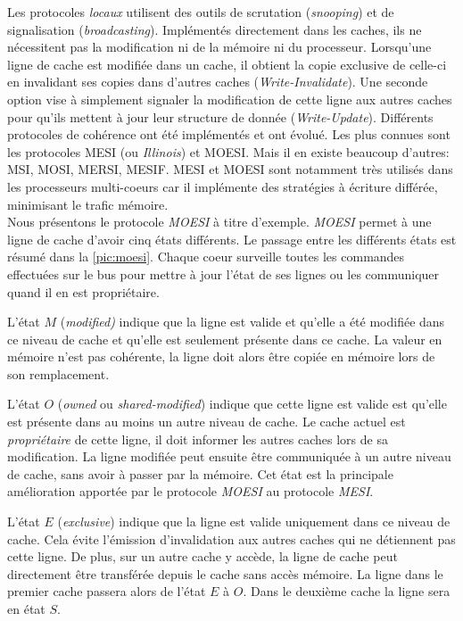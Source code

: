             Les protocoles \textit{locaux} utilisent des outils de scrutation (\textit{snooping}) et de signalisation (\textit{broadcasting}). Implémentés directement dans les caches, ils ne nécessitent pas la modification ni de la mémoire ni du processeur. Lorsqu'une ligne de cache est modifiée dans un cache, il obtient la copie exclusive de celle-ci en invalidant ses copies dans d'autres caches (\textit{Write-Invalidate}). Une seconde option vise à simplement signaler la modification de cette ligne aux autres caches pour qu'ils mettent à jour leur structure de donnée (\textit{Write-Update}).  Différents protocoles de cohérence ont été implémentés et ont évolué. Les plus connues sont les protocoles MESI (ou \textit{Illinois}) \cite{papamarcos1984low} et MOESI. Mais il en existe beaucoup d'autres: MSI, MOSI, MERSI, MESIF. MESI et MOESI sont notamment très utilisés dans les processeurs multi-coeurs car il implémente des stratégies à écriture différée, minimisant le trafic mémoire.
            \\
            Nous présentons le protocole \textit{MOESI} à titre d'exemple. \textit{MOESI}  permet à une ligne de cache d'avoir cinq états différents. Le passage entre les différents états est résumé dans la \autoref{pic:moesi}. Chaque coeur surveille toutes les commandes effectuées sur le bus pour mettre à jour l'état de ses lignes ou les communiquer quand il en est propriétaire.
            
            L'état $M$ (\textit{modified)} indique que la ligne est valide et qu'elle a été modifiée dans ce niveau de cache et qu'elle est seulement présente dans ce cache. La valeur en mémoire n'est pas cohérente, la ligne doit alors être copiée en mémoire lors de son remplacement. 
            
            L'état $O$ (\textit{owned} ou \textit{shared-modified}) indique que cette ligne est valide est qu'elle est présente dans au moins un autre niveau de cache. Le cache actuel est \textit{propriétaire} de cette ligne, il doit informer les autres caches lors de sa modification. La ligne modifiée peut ensuite être communiquée à un autre niveau de cache, sans avoir à passer par la mémoire. Cet état est la principale amélioration apportée par le protocole \textit{MOESI} au protocole \textit{MESI}.
            
            L'état $E$ (\textit{exclusive}) indique que la ligne est valide uniquement dans ce niveau de cache. Cela évite l'émission d'invalidation aux autres caches qui ne détiennent pas cette ligne. De plus, sur un autre cache y accède, la ligne de cache peut directement être transférée depuis le cache sans accès mémoire. La ligne dans le premier cache passera alors de l'état $E$ à $O$. Dans le deuxième cache la ligne sera en état $S$.
            
